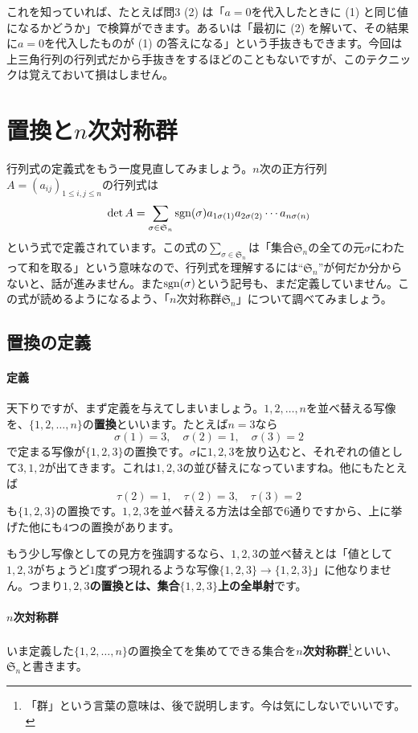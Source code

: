 これを知っていれば、たとえば問3 (2) は「$a = 0$を代入したときに (1) と同じ値になるかどうか」で検算ができます。あるいは「最初に (2) を解いて、その結果に$a = 0$を代入したものが (1) の答えになる」という手抜きもできます。今回は上三角行列の行列式だから手抜きをするほどのこともないですが、このテクニックは覚えておいて損はしません。

\section{置換と$n$次対称群}

行列式の定義式をもう一度見直してみましょう。$n$次の正方行列$A = (a_{ij})_{1 \leq i, j \leq n}$の行列式は
\[
\det A = \sum_{\sigma \in \mathfrak{S}_n} \operatorname{sgn}(\sigma) a_{1 \sigma(1)} a_{2 \sigma(2)} \cdots a_{n \sigma(n)}
\]
という式で定義されています。この式の$\sum_{\sigma \in \mathfrak{S}_n}$は「集合$\mathfrak{S}_n$の全ての元$\sigma$にわたって和を取る」という意味なので、行列式を理解するには``$\mathfrak{S}_n$''が何だか分からないと、話が進みません。また$\operatorname{sgn}(\sigma)$という記号も、まだ定義していません。この式が読めるようになるよう、「$n$次対称群$\mathfrak{S}_n$」について調べてみましょう。

\subsection{置換の定義}

\paragraph{定義}

天下りですが、まず定義を与えてしまいましょう。$1, 2, \ldots, n$を並べ替える写像を、$\{1, 2, \ldots, n\}$の\textbf{置換}といいます。たとえば$n = 3$なら
\[
\sigma(1) = 3, \quad \sigma(2) = 1, \quad \sigma(3) = 2
\]
で定まる写像が$\{1, 2, 3\}$の置換です。$\sigma$に$1, 2, 3$を放り込むと、それぞれの値として$3, 1, 2$が出てきます。これは$1, 2, 3$の並び替えになっていますね。他にもたとえば
\[
\tau(2) = 1, \quad \tau(2) = 3, \quad \tau(3) = 2
\]
も$\{1, 2, 3\}$の置換です。$1, 2, 3$を並べ替える方法は全部で$6$通りですから、上に挙げた他にも$4$つの置換があります。

もう少し写像としての見方を強調するなら、$1, 2, 3$の並べ替えとは「値として$1, 2, 3$がちょうど$1$度ずつ現れるような写像$\{1, 2, 3\}\rightarrow \{1, 2, 3\}$」に他なりません。つまり\textbf{$1, 2, 3$の置換とは、集合$\{1, 2, 3\}$上の全単射}です。

\paragraph{$n$次対称群}
いま定義した$\{1, 2, \ldots, n\}$の置換全てを集めてできる集合を\textbf{$n$次対称群}\footnote{「群」という言葉の意味は、後で説明します。今は気にしないでいいです。}といい、$\mathfrak{S}_n$と書きます。

